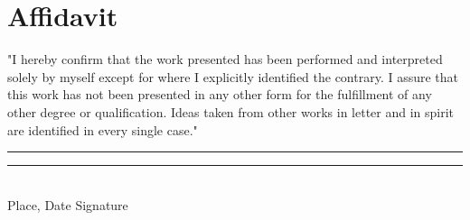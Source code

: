 \section*{Affidavit}
\vspace*{1.0cm}
"I  hereby confirm that the  work  presented  has  been  performed  and interpreted solely by myself except for where I explicitly identified the contrary. I assure that this work has not been presented in any other form for the fulfillment of any other degree or qualification. Ideas taken from other works in letter and in spirit are identified in every single case."\\
\newline
\newline
\newline

\noindent

\rule{5.5cm}{0.4pt} \phantom{ssssssssssssssssspace} \rule{5.5cm}{0.4pt}\\
\phantom{space}Place, Date \phantom{sssssssssssssssssssssssssssssssssssssssssssspace} Signature
